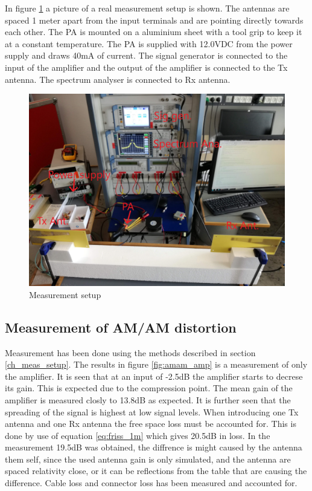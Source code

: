 In figure \ref{fig:Meas_setup} a picture of a real measurement setup is shown. The antennas are spaced 1 meter apart from the input terminals and are pointing directly towards each other. The PA is mounted on a aluminium sheet with a tool grip to keep it at a constant temperature. The PA is supplied with 12.0VDC from the power supply and draws 40mA of current. The signal generator is connected to the input of the amplifier and the output of the amplifier is connected to the Tx antenna. The spectrum analyser is connected to Rx antenna. 


\begin{figure}[H]
\centering 
\includegraphics[scale = 0.1]{figures/measurement/measurement_setup.jpg}
\caption{Measurement setup}
\label{fig:Meas_setup}
\end{figure} 




\subsection{Measurement of AM/AM distortion}\label{ch:meas_amam}
Measurement has been done using the methods described in section \ref{ch_meas_setup}. The results in figure \ref{fig:amam_amp} is a measurement of only the amplifier. It is seen that at an input of -2.5dB the amplifier starts to decrese its gain. This is expected due to the compression point. The mean gain of the amplifier is  measured closly to 13.8dB as expected. It is further seen that the spreading of the signal is highest at low signal levels. When introducing one Tx antenna and one Rx antenna the free space loss must be accounted for. This is done by use of equation \ref{eq:friss_1m} which gives 20.5dB in loss. In the measurement 19.5dB was obtained, the diffrence is might caused by the antenna them self, since the used antenna gain is only simulated, and the antenna are spaced relativity close, or it can be reflections from the table that are causing the difference. Cable loss and connector loss has been measured and accounted for.  

